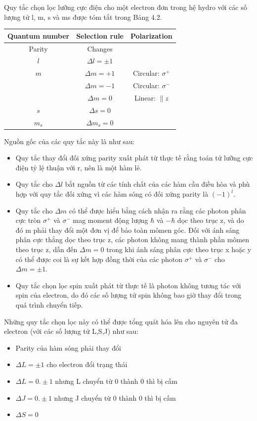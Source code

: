 \documentclass{article}
\begin{document}
Quy tắc chọn lọc lưỡng cực điện cho một electron đơn trong hệ hydro với các số lượng tử l, m, s và ms được tóm tắt trong Bảng 4.2.\\
\begin{center}
\begin{tabular}{|c|c|c|}
	\hline
	Quantum number & Selection rule & Polarization \\
	\hline
	Parity & Changes & \\
	\hline
	$l$ & $\Delta l = \pm 1$ & \\
	\hline
	$m$ & $\Delta m = +1$ & Circular: $\sigma^{+}$ \\
	\cline{3-3}
	& $\Delta m = -1$ & Circular: $\sigma^{-}$ \\
	\cline{3-3}
	& $\Delta m = 0$ & Linear: $\parallel z$ \\
	\hline
	$s$ & $\Delta s = 0$ & \\
	\hline
	$m_s$ & $\Delta m_s = 0$ & \\
	\hline
\end{tabular}
\end{center}
 Nguồn gốc của các quy tắc này là như sau:
\begin{itemize}
	\item Quy tắc thay đổi đối xứng parity xuất phát từ thực tế rằng toán tử lưỡng cực điện tỷ lệ thuận với r, nên là một hàm lẻ.
	\item Quy tắc cho $\Delta l$ bắt nguồn từ các tính chất của các hàm cầu điều hòa và phù hợp với quy tắc đối xứng vì các hàm sóng có đối xứng parity là $(-1)^l$.
	\item Quy tắc cho $\Delta m$ có thể được hiểu bằng cách nhận ra rằng các photon phân cực tròn $\sigma^+$ và $\sigma^-$ mag moment động lượng $\hbar$ và $-\hbar$ dọc theo trục z, và do đó m phải thay đổi một đơn vị để bảo toàn mômen góc. Đối với ánh sáng phân cực thẳng dọc theo trục z, các photon không mang thành phần mômen theo trục z, dẫn đến $\Delta m = 0$ trong khi ánh sáng phân cực theo trục x hoặc y có thể được coi là sự kết hợp đồng thời của các photon $\sigma^+$ và $\sigma^-$ cho $\Delta m = \pm 1$.
	\item Quy tắc chọn lọc spin xuất phát từ thực tế là photon không tương tác với spin của electron, do đó các số lượng tử spin không bao giờ thay đổi trong quá trình chuyển tiếp.
\end{itemize}
Những quy tắc chọn lọc này có thể được tổng quát hóa lên cho nguyên tử đa electron (với các số lượng tử L,S,J) như sau:
\begin{itemize}
	\item Parity của hàm sóng phải thay đổi
	\item $\Delta L =\pm 1$ cho electron đổi trạng thái
	\item $\Delta L=0. \pm 1$ nhưng L chuyển từ 0 thành 0 thì bị cấm
	\item  $\Delta J=0. \pm 1$ nhưng J chuyển từ 0 thành 0 thì bị cấm
	\item $\Delta S = 0$
\end{itemize}
\end{document}
